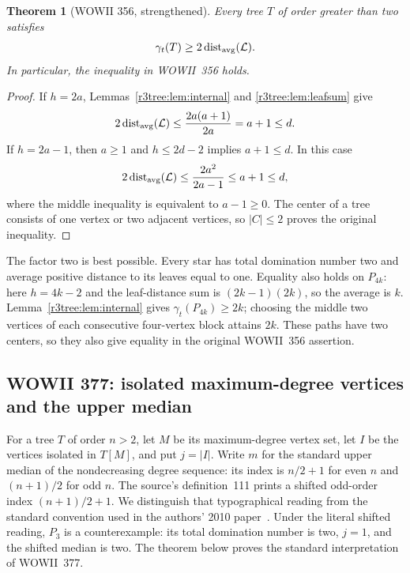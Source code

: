 \documentclass[11pt,a4paper]{article}
\newtheorem{theorem}{Theorem}[section]
\theoremstyle{remark}
\begin{document}
\begin{theorem}[WOWII 356, strengthened]\label{r3tree:thm:356}
Every tree $T$ of order greater than two satisfies
\[
\gamma_t(T)\ge2\operatorname{dist}_{\rm avg}(\mathcal L).
\]
In particular, the inequality in WOWII~356 holds.
\end{theorem}
\begin{proof}
If $h=2a$, Lemmas~\ref{r3tree:lem:internal} and
\ref{r3tree:lem:leafsum} give
\[
2\operatorname{dist}_{\rm avg}(\mathcal L)
 \le\frac{2a(a+1)}{2a}=a+1\le d.
\]
If $h=2a-1$, then $a\ge1$ and $h\le2d-2$ implies $a+1\le d$.
In this case
\[
2\operatorname{dist}_{\rm avg}(\mathcal L)
 \le\frac{2a^2}{2a-1}\le a+1\le d,
\]
where the middle inequality is equivalent to $a-1\ge0$.
The center of a tree consists of one vertex or two adjacent vertices,
so $|C|\le2$ proves the original inequality.
\end{proof}

The factor two is best possible.  Every star has total domination
number two and average positive distance to its leaves equal to one.
Equality also holds on $P_{4k}$: here $h=4k-2$ and the leaf-distance
sum is $(2k-1)(2k)$, so the average is $k$.
Lemma~\ref{r3tree:lem:internal} gives $\gamma_t(P_{4k})\ge2k$;
choosing the middle two vertices of each consecutive four-vertex
block attains $2k$.  These paths have two centers, so they also give
equality in the original WOWII~356 assertion.

\subsection{WOWII 377: isolated maximum-degree vertices and the upper median}
\label{r3tree:sec:377}

For a tree $T$ of order $n>2$, let $M$ be its maximum-degree vertex
set, let $I$ be the vertices isolated in $T[M]$, and put $j=|I|$.
Write $m$ for the standard upper median of the nondecreasing degree
sequence: its index is $n/2+1$ for even $n$ and $(n+1)/2$ for odd $n$.
The source's definition~111 prints a shifted odd-order index
$(n+1)/2+1$.  We distinguish that typographical reading
from the standard convention used in the authors' 2010
paper~\cite[author manuscript, p.~14]{DLPW10_2dom}.
Under the literal shifted reading, $P_3$ is a counterexample: its
total domination number is two, $j=1$, and the shifted median is two.
The theorem below proves the standard interpretation of WOWII~377.
\end{document}
